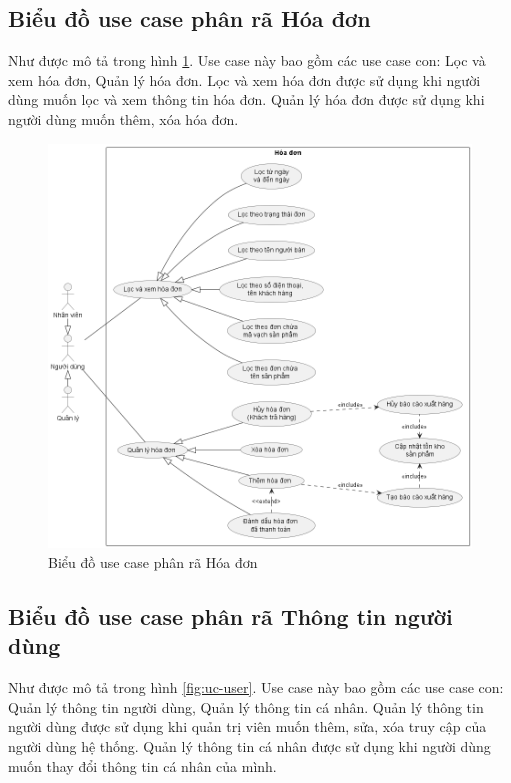 \documentclass[../DoAn.tex]{subfiles}
\begin{document}
\subsection{Biểu đồ use case phân rã Hóa đơn}
\label{subsection:uc-invoice}
Như được mô tả trong hình \ref{fig:uc-invoice}. Use case này bao gồm các use case con: Lọc và xem hóa đơn, Quản lý hóa đơn. Lọc và xem hóa đơn được sử dụng khi người dùng muốn lọc và xem thông tin hóa đơn. Quản lý hóa đơn được sử dụng khi người dùng muốn thêm, xóa hóa đơn.

\begin{figure}[H]
    \centering
    \includegraphics[width=\textwidth]{Hinhve/usecases/Invoice}
    \caption{Biểu đồ use case phân rã Hóa đơn}
    \label{fig:uc-invoice}
\end{figure}
\break


\subsection{Biểu đồ use case phân rã Thông tin người dùng}
\label{subsection:uc-user}
Như được mô tả trong hình \ref{fig:uc-user}. Use case này bao gồm các use case con: Quản lý thông tin người dùng, Quản lý thông tin cá nhân. Quản lý thông tin người dùng được sử dụng khi quản trị viên muốn thêm, sửa, xóa truy cập của người dùng hệ thống. Quản lý thông tin cá nhân được sử dụng khi người dùng muốn thay đổi thông tin cá nhân của mình.
\end{document}
